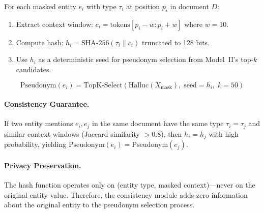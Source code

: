 \documentclass[11pt, a4paper]{article}
\newcommand{\Xmask}{X_{\text{mask}}}
\begin{document}
For each masked entity $e_i$ with type $\tau_i$ at position $p_i$ in document $D$:

\begin{enumerate}
  \item Extract context window: $c_i = \text{tokens}[p_i - w : p_i + w]$ where $w = 10$.
  \item Compute hash: $h_i = \text{SHA-256}(\tau_i \| c_i)$ truncated to 128 bits.
  \item Use $h_i$ as a deterministic seed for pseudonym selection from Model~II's top-$k$ candidates.
\end{enumerate}

\begin{equation}
\text{Pseudonym}(e_i) = \text{TopK-Select}\!\left(\text{Halluc}(\Xmask), \; \text{seed} = h_i, \; k = 50\right)
\end{equation}

\paragraph{Consistency Guarantee.}
If two entity mentions $e_i, e_j$ in the same document have the same type $\tau_i = \tau_j$ and similar context windows (Jaccard similarity $> 0.8$), then $h_i = h_j$ with high probability, yielding $\text{Pseudonym}(e_i) = \text{Pseudonym}(e_j)$.

\paragraph{Privacy Preservation.}
The hash function operates only on (entity type, masked context)---never on the original entity value. Therefore, the consistency module adds zero information about the original entity to the pseudonym selection process.
\end{document}
